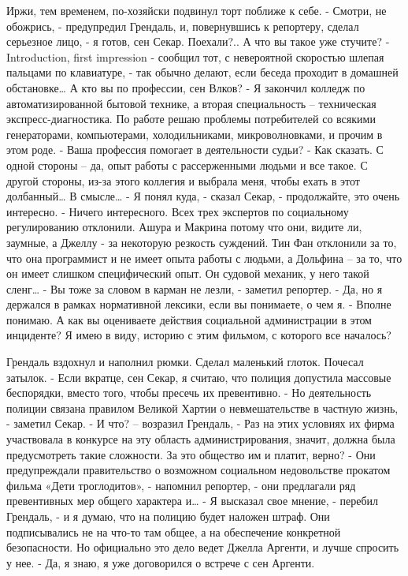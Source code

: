 \documentclass{book}
\begin{document}
Иржи, тем временем, по-хозяйски подвинул торт поближе к себе.
- Смотри, не обожрись, - предупредил Грендаль, и, повернувшись к репортеру, сделал серьезное лицо, - я готов, сен Секар. Поехали?.. А что вы такое уже стучите?
- Introduction, first impression - сообщил тот, с невероятной скоростью шлепая пальцами по клавиатуре, - так обычно делают, если беседа проходит в домашней обстановке\ldots{} А кто вы по профессии, сен Влков?
- Я закончил колледж по автоматизированной бытовой технике, а вторая специальность -- техническая экспресс-диагностика. По работе решаю проблемы потребителей со всякими генераторами, компьютерами, холодильниками, микроволновками, и прочим в этом роде.
- Ваша профессия помогает в деятельности судьи?
- Как сказать. С одной стороны -- да, опыт работы с рассерженными людьми и все такое. С другой стороны, из-за этого коллегия и выбрала меня, чтобы ехать в этот долбанный\ldots{} В смысле\ldots{}
- Я понял куда, - сказал Секар, - продолжайте, это очень интересно.
- Ничего интересного. Всех трех экспертов по социальному регулированию отклонили. Ашура и Макрина потому что они, видите ли, заумные, а Джеллу - за некоторую резкость суждений. Тин Фан отклонили за то, что она программист и не имеет опыта работы с людьми, а Дольфина -- за то, что он имеет слишком специфический опыт. Он судовой механик, у него такой сленг\ldots{}
- Вы тоже за словом в карман не лезли, - заметил репортер.
- Да, но я держался в рамках нормативной лексики, если вы понимаете, о чем я.
- Вполне понимаю. А как вы оцениваете действия социальной администрации в этом инциденте? Я имею в виду, историю с этим фильмом, с которого все началось?

Грендаль вздохнул и наполнил рюмки. Сделал маленький глоток. Почесал затылок.
- Если вкратце, сен Секар, я считаю, что полиция допустила массовые беспорядки, вместо того, чтобы пресечь их превентивно.
- Но деятельность полиции связана правилом Великой Хартии о невмешательстве в частную жизнь, - заметил Секар.
- И что? -- возразил Грендаль, - Раз на этих условиях их фирма участвовала в конкурсе на эту область администрирования, значит, должна была предусмотреть такие сложности. За это общество им и платит, верно?
- Они предупреждали правительство о возможном социальном недовольстве прокатом фильма «Дети троглодитов», - напомнил репортер, - они предлагали ряд превентивных мер общего характера и\ldots{}
- Я высказал свое мнение, - перебил Грендаль, - и я думаю, что на полицию будет наложен штраф. Они подписывались не на что-то там общее, а на обеспечение конкретной безопасности. Но официально это дело ведет Джелла Аргенти, и лучше спросить у нее.
- Да, я знаю, я уже договорился о встрече с сен Аргенти.
\end{document}

